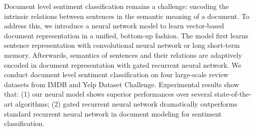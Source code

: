 Document level sentiment classification remains a challenge: encoding the intrinsic relations between sentences in the semantic meaning of a document. To address this, we introduce a neural network model to learn vector-based document representation in a unified, bottom-up fashion. The model first learns sentence representation with convolutional neural network or long short-term memory. Afterwards, semantics of sentences and their relations are adaptively encoded in document representation with gated recurrent neural network. We conduct document level sentiment classification on four large-scale review datasets from IMDB and Yelp Dataset Challenge. Experimental results show that: (1) our neural model shows superior performances over several state-of-the-art algorithms; (2) gated recurrent neural network dramatically outperforms standard recurrent neural network in document modeling for sentiment classification.
